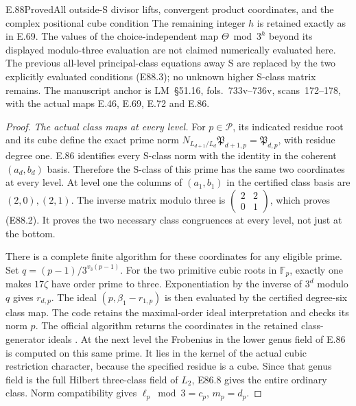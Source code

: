 \begin{statement}{E.88}{Proved}{All outside-S divisor lifts, convergent product coordinates, and the complex positional cube condition}
The remaining integer $h$ is retained exactly
as in E.69. The values of the choice-independent
map $\Theta\bmod3^h$ beyond its displayed
modulo-three evaluation are not claimed
numerically evaluated here. The previous
all-level principal-class equations away S
are replaced by the two explicitly evaluated
conditions (E88.3); no unknown higher
S-class matrix remains. The manuscript
anchor is LM~\S51.16, fols.~733v--736v,
scans~172--178, with the actual maps
E.46, E.69, E.72 and E.86.
\end{statement}

\begin{proof}
\emph{The actual class maps at every level.}
For $p\in\mathcal P$, its indicated residue
root and its cube define the exact prime
norm
$N_{L_{d+1}/L_d}\mathfrak P_{d+1,p}
=\mathfrak P_{d,p}$, with residue degree
one. E.86 identifies every S-class norm
with the identity in the coherent
$(a_d,b_d)$ basis. Therefore the S-class
of this prime has the same two coordinates
at every level. At level one the columns
of $(a_1,b_1)$ in the certified class
basis are $(2,0),(2,1)$. The inverse
matrix modulo three is
$\left(\begin{smallmatrix}2&2\\0&1\end{smallmatrix}\right)$,
which proves (E88.2). It proves the
two necessary class congruences at
every level, not just at the bottom.

There is a complete finite algorithm
for these coordinates for any eligible
prime. Set $q=(p-1)/3^{v_3(p-1)}$.
For the two primitive cubic roots in
$\mathbb F_p$, exactly one makes
$17\zeta$ have order prime to three.
Exponentiation by the inverse of
$3^d$ modulo $q$ gives $r_{d,p}$.
The ideal $(p,\beta_1-r_{1,p})$ is
then evaluated by the certified
degree-six class map. The code retains
the maximal-order ideal interpretation
and checks its norm $p$. The official
algorithm returns the coordinates in
the retained class-generator ideals
\cite[entries \texttt{bnfcertify},
\texttt{bnfisprincipal}, \texttt{bnrisprincipal}]
{E_PARICertifiedUnits}.
At the next level the Frobenius in
the lower genus field of E.86 is
computed on this same prime. It lies
in the kernel of the actual cubic
restriction character, because the
specified residue is a cube. Since
that genus field is the full Hilbert
three-class field of $L_2$, E86.8
gives the entire ordinary class.
Norm compatibility gives
$\ell_p\bmod3=c_p$, $m_p=d_p$.


\end{proof}
